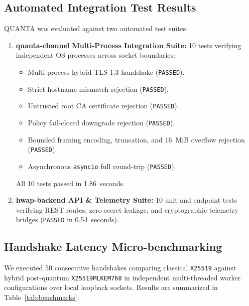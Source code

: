 \documentclass[conference]{IEEEtran}
\begin{document}
\subsection{Automated Integration Test Results}
QUANTA was evaluated against two automated test suites:
\begin{enumerate}
    \item \textbf{quanta-channel Multi-Process Integration Suite:} 10 tests verifying independent OS processes across socket boundaries:
    \begin{itemize}
        \item Multi-process hybrid TLS 1.3 handshake (\texttt{PASSED}).
        \item Strict hostname mismatch rejection (\texttt{PASSED}).
        \item Untrusted root CA certificate rejection (\texttt{PASSED}).
        \item Policy fail-closed downgrade rejection (\texttt{PASSED}).
        \item Bounded framing encoding, truncation, and 16~MiB overflow rejection (\texttt{PASSED}).
        \item Asynchronous \texttt{asyncio} full round-trip (\texttt{PASSED}).
    \end{itemize}
    All 10 tests passed in 1.86~seconds.
    \item \textbf{hwap-backend API & Telemetry Suite:} 10 unit and endpoint tests verifying REST routes, zero secret leakage, and cryptographic telemetry bridges (\texttt{PASSED} in 0.54~seconds).
\end{enumerate}

\subsection{Handshake Latency Micro-benchmarking}
We executed 50 consecutive handshakes comparing classical \texttt{X25519} against hybrid post-quantum \texttt{X25519MLKEM768} in independent multi-threaded worker configurations over local loopback sockets. Results are summarized in Table~\ref{tab:benchmarks}.
\end{document}
